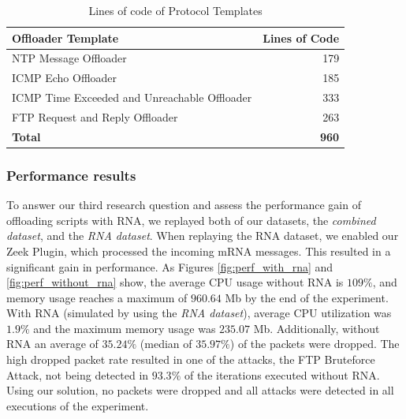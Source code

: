 \begin{table}[htb]
    \caption{Lines of code of Protocol Templates}
    \begin{center}
        \begin{tabular}{|l|r|}
            \hline
            Offloader Template                           & Lines of Code \\ \hline
            NTP Message Offloader                        & 179           \\ \hline
            ICMP Echo Offloader                          & 185           \\ \hline
            ICMP Time Exceeded and Unreachable Offloader & 333           \\ \hline
            FTP Request and Reply Offloader              & 263           \\ \hline
            \textbf{Total}                               & \textbf{960}  \\ \hline
        \end{tabular}%
    \end{center}
    \label{tab:lines_by_offloader_template}
\end{table}

\subsubsection*{Performance results}

To answer our third research question and assess the performance gain of offloading scripts with RNA, we replayed both of our datasets, the \textit{combined dataset}, and the \textit{RNA dataset}. When replaying the RNA dataset, we enabled our Zeek Plugin, which processed the incoming mRNA messages. This resulted in a significant gain in performance. As Figures \ref{fig:perf_with_rna} and \ref{fig:perf_without_rna} show, the average CPU usage without RNA is $109\%$, and memory usage reaches a maximum of $960.64$ Mb by the end of the experiment. With RNA (simulated by using the \textit{RNA dataset}), average CPU utilization was $1.9\%$ and the maximum memory usage was $235.07$ Mb. Additionally, without RNA an average of $35.24\%$ (median of $35.97\%$) of the packets were dropped. The high dropped packet rate resulted in one of the attacks, the FTP Bruteforce Attack, not being detected in $93.3\%$ of the iterations executed without RNA. Using our solution, no packets were dropped and all attacks were detected in all executions of the experiment.



